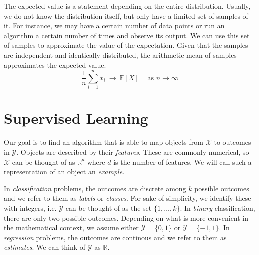 \documentclass[
    a4paper, %
	fontsize=10pt, %
	twoside=false, %
]{kaobook}
\begin{document}
The expected value is a statement depending on the entire distribution. Usually, we do not know the distribution itself, but only have a limited set of samples of it. For instance, we may have a certain number of data points or run an algorithm a certain number of times and observe its output. We can use this set of samples to approximate the value of the expectation. Given that the samples are independent and identically distributed, the arithmetic mean of samples approximates the expected value.
$$
\frac{1}{n} \sum_{i=1}^n x_i ~ \rightarrow ~ \mathbb{E}\left[X\right]  ~ \hspace{1em} \text{as $n \to \infty$}
$$


\section{Supervised Learning}
\label{sec:supervised-learning}

Our goal is to find an algorithm that is able to map objects from $\mathcal{X}$ to outcomes in $\mathcal{Y}$. Objects
are described by their \textit{features}. These are commonly numerical, so $\mathcal{X}$ can be thought of as $\mathbb{R}^d$ where $d$ is the number of features. We will call such a representation of an object an \textit{example}.

In \textit{classification} problems, the outcomes are discrete among $k$ possible outcomes and we refer to them as \textit{labels} or \textit{classes}. For sake of simplicity, we identify these with integers, i.e. $\mathcal{Y}$ can be thought of as the set $\{ 1, \dots, k \}$. In \textit{binary} classification, there are only two possible outcomes. Depending on what is more convenient in the mathematical context, we assume either $\mathcal{Y} = \{0,1\}$ or $\mathcal{Y} = \{-1, 1\}$.
In \textit{regression} problems, the outcomes are continous and we refer to them as \textit{estimates}. We can think of $\mathcal{Y}$ as $\mathbb{R}$.
\end{document}
